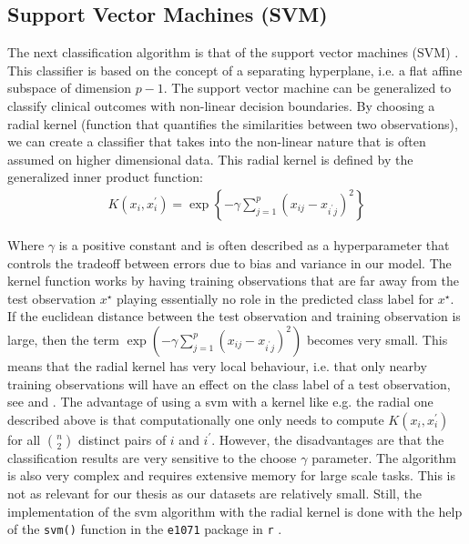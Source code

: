 \documentclass[../thesis.tex]{subfiles}
\begin{document}
\subsection{Support Vector Machines (SVM)}
\label{subsec:svm}

\noindent The next classification algorithm is that of the support vector machines (SVM) \citep{vapnik1963pattern}. This classifier is based on the concept of a separating hyperplane, i.e. a flat affine subspace of dimension $p-1$. The support vector machine can be generalized to classify clinical outcomes with non-linear decision boundaries. By choosing a radial kernel (function that quantifies the similarities between two observations), we can create a classifier that takes into the non-linear nature that is often assumed on higher dimensional data. This radial kernel is defined by the generalized inner product function: 
\begin{align}
    K(x_i, x_i^\prime) = \exp{\left\{-\gamma \sum_{j=1}^p\left(x_{ij} - x_{i^\prime j} \right)^2\right\}}
\end{align}

\noindent Where $\gamma$ is a positive constant and is often described as a hyperparameter that controls the tradeoff between errors due to bias and variance in our model. The kernel function works by having training observations that are far away from the test observation $x^\star$ playing essentially no role in the predicted class label for $x^\star$. If the euclidean distance between the test observation and training observation is large, then the term $\exp{(-\gamma \sum_{j=1}^p\left(x_{ij} - x_{i^\prime j} \right)^2)}$ becomes very small. This means that the radial kernel has very local behaviour, i.e. that only nearby training observations will have an effect on the class label of a test observation, see \citep{friedman2009elements} and \citep{james2013introduction}. The advantage of using a svm with a kernel like e.g. the radial one described above is that computationally one only needs to compute $K(x_i, x_i^\prime)$ for all $\binom{n}{2}$ distinct pairs of $i$ and $i^\prime$. However, the disadvantages are that the classification results are very sensitive to the choose $\gamma$ parameter. The algorithm is also very complex and requires extensive memory for large scale tasks. This is not as relevant for our thesis as our datasets are relatively small. Still, the implementation of the svm algorithm with the radial kernel is done with the help of the \texttt{svm()} function in the \texttt{e1071} package in \texttt{r} \citep{svm}.
\end{document}
